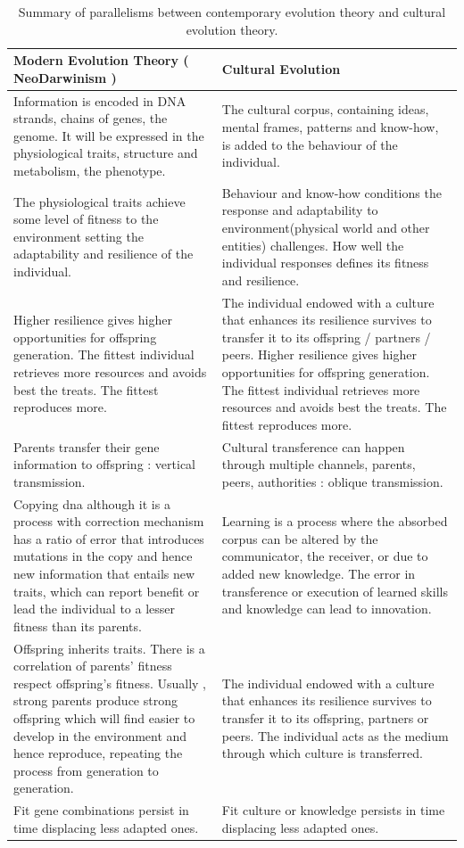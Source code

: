\documentclass[11pt,oneside,a4paper,openright]{report}
\begin{document}
	\begin{table}[ht!]
	\centering
	\begin{tabular}{|p{7cm}|p{7cm}|}
		\hline
		\textbf{Modern Evolution Theory} ( NeoDarwinism )
		&
		\textbf{Cultural Evolution}\\
		\hline
		Information is encoded in DNA strands, chains of genes, the genome. It will be expressed in the physiological traits, structure and metabolism, the phenotype.
		&
		The cultural corpus, containing ideas, mental frames, patterns and know-how, is added to the behaviour of the individual.\\
		\hline
		The physiological traits achieve some level of fitness to the environment setting the adaptability and resilience of the individual.
		&
		Behaviour and know-how conditions the response  and adaptability to environment(physical world and other entities) challenges. How well the individual responses defines its fitness and resilience.\\
		\hline
		Higher resilience gives higher opportunities for offspring generation. The fittest individual retrieves more resources and avoids best the treats. The fittest reproduces more.
		&
		The individual endowed with a culture that enhances its resilience survives to transfer it to its offspring / partners / peers. Higher resilience gives higher opportunities for offspring generation. The fittest individual retrieves more resources and avoids best the treats. The fittest reproduces more.\\
		\hline
		Parents transfer their gene information to offspring : vertical transmission.
		&
		Cultural transference can happen through multiple channels, parents, peers, authorities : oblique transmission.\\	
		\hline
		Copying dna although it is a process with correction mechanism has a ratio of error that introduces mutations in the copy and hence new information that entails new traits, which can report benefit or lead the individual to a lesser fitness than its parents.
		&
		Learning is a process where the absorbed corpus can be altered by the communicator, the receiver, or due to added new knowledge. The error in transference or execution of learned skills and knowledge can lead to innovation.\\
		\hline
		Offspring inherits traits. There is a correlation of parents' fitness respect offspring's fitness. Usually , strong parents produce strong offspring which will find easier to develop in the environment and hence reproduce, repeating the process from generation to generation.
		&
		The individual endowed with a culture that enhances its resilience survives to transfer it to its offspring, partners or peers. The individual acts as the medium through which culture is transferred.\\ 
		\hline
		Fit gene combinations persist in time displacing less adapted ones.
		&
		Fit culture or knowledge persists in time displacing less adapted ones.\\		
		\hline
	\end{tabular}
	\caption{Summary of parallelisms between contemporary evolution theory and cultural evolution theory.}
	\label{tab:EvolThVSCultevol}
	\end{table}
\end{document}
